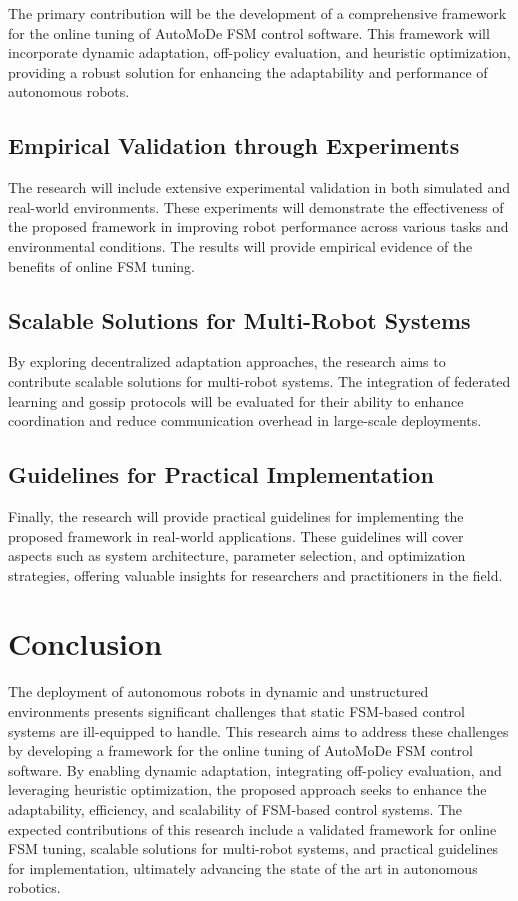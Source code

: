 \documentclass{ULBreport}
\begin{document}
The primary contribution will be the development of a comprehensive framework for the online tuning of AutoMoDe FSM control software. This framework will incorporate dynamic adaptation, off-policy evaluation, and heuristic optimization, providing a robust solution for enhancing the adaptability and performance of autonomous robots.

\subsection{Empirical Validation through Experiments}

The research will include extensive experimental validation in both simulated and real-world environments. These experiments will demonstrate the effectiveness of the proposed framework in improving robot performance across various tasks and environmental conditions. The results will provide empirical evidence of the benefits of online FSM tuning.

\subsection{Scalable Solutions for Multi-Robot Systems}

By exploring decentralized adaptation approaches, the research aims to contribute scalable solutions for multi-robot systems. The integration of federated learning and gossip protocols will be evaluated for their ability to enhance coordination and reduce communication overhead in large-scale deployments.

\subsection{Guidelines for Practical Implementation}

Finally, the research will provide practical guidelines for implementing the proposed framework in real-world applications. These guidelines will cover aspects such as system architecture, parameter selection, and optimization strategies, offering valuable insights for researchers and practitioners in the field.

\section{Conclusion}

The deployment of autonomous robots in dynamic and unstructured environments presents significant challenges that static FSM-based control systems are ill-equipped to handle. This research aims to address these challenges by developing a framework for the online tuning of AutoMoDe FSM control software. By enabling dynamic adaptation, integrating off-policy evaluation, and leveraging heuristic optimization, the proposed approach seeks to enhance the adaptability, efficiency, and scalability of FSM-based control systems. The expected contributions of this research include a validated framework for online FSM tuning, scalable solutions for multi-robot systems, and practical guidelines for implementation, ultimately advancing the state of the art in autonomous robotics.

\newpage

\printbibliography
\end{document}

